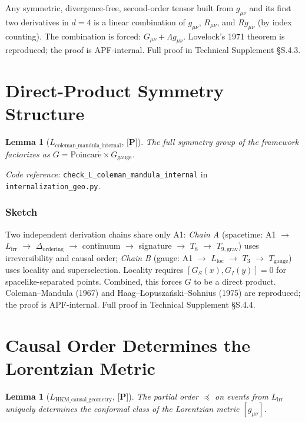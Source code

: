 \documentclass[11pt]{article}
\newcommand{\coderef}[2]{\smallskip\noindent\textit{Code reference:} \texttt{#1} in \texttt{#2}.}
\newcommand{\epitag}[1]{\textbf{[#1]}}
\newtheorem{lemma}[theorem]{Lemma}
\theoremstyle{definition}
\begin{document}
Any symmetric, divergence-free, second-order tensor built from $g_{\mu\nu}$ and its first two derivatives in $d = 4$ is a linear combination of $g_{\mu\nu}$, $R_{\mu\nu}$, and $R g_{\mu\nu}$ (by index counting).  The combination is forced: $G_{\mu\nu} + \Lambda g_{\mu\nu}$.  Lovelock's 1971 theorem is reproduced; the proof is APF-internal.  Full proof in Technical Supplement \S S.4.3.

\section{Direct-Product Symmetry Structure}\label{sec:directproduct}

\begin{lemma}[$L_{\mathrm{coleman\_mandula\_internal}}$, $\epitag{P}$]
The full symmetry group of the framework factorizes as $G = \mathrm{Poincar\acute{e}} \times G_{\mathrm{gauge}}$.
\end{lemma}

\coderef{check\_L\_coleman\_mandula\_internal}{internalization\_geo.py}

\subsubsection*{Sketch}
Two independent derivation chains share only A1: \emph{Chain A} (spacetime: A1 $\to$ $L_{\mathrm{irr}}$ $\to$ $\Delta_{\mathrm{ordering}}$ $\to$ continuum $\to$ signature $\to$ $T_8$ $\to$ $T_{9,\mathrm{grav}}$) uses irreversibility and causal order; \emph{Chain B} (gauge: A1 $\to$ $L_{\mathrm{loc}}$ $\to$ $T_3$ $\to$ $T_{\mathrm{gauge}}$) uses locality and superselection.  Locality requires $[G_S(x), G_I(y)] = 0$ for spacelike-separated points.  Combined, this forces $G$ to be a direct product.  Coleman--Mandula (1967) and Haag--{\L}opuszański--Sohnius (1975) are reproduced; the proof is APF-internal.  Full proof in Technical Supplement \S S.4.4.

\section{Causal Order Determines the Lorentzian Metric}\label{sec:causalorder}

\begin{lemma}[$L_{\mathrm{HKM\_causal\_geometry}}$, $\epitag{P}$]
The partial order $\preceq$ on events from $L_{\mathrm{irr}}$ uniquely determines the conformal class of the Lorentzian metric $[g_{\mu\nu}]$.
\end{lemma}
\end{document}
